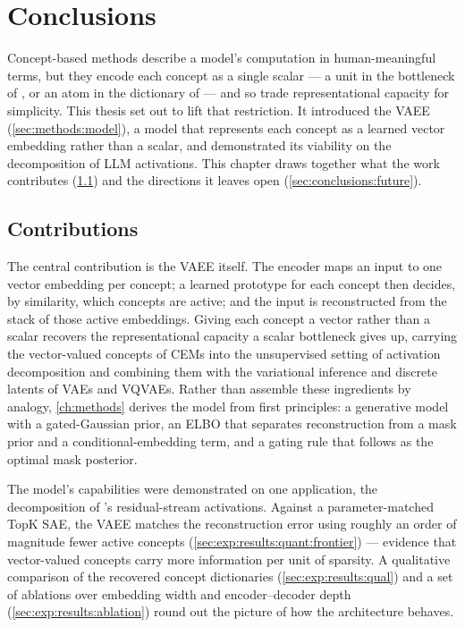 \chapter{Conclusions} \label{ch:conclusions}

Concept-based methods describe a model's computation in human-meaningful terms,
but they encode each concept as a single scalar --- a unit in the bottleneck of
, or an atom in the dictionary of  --- and so trade
representational capacity for simplicity. This thesis set out to lift that
restriction. It introduced the \ac{VAEE}
(\cref{sec:methods:model}), a model that
represents each concept as a learned vector embedding rather than a scalar, and
demonstrated its viability on the decomposition of \ac{LLM} activations. This
chapter draws together what the work contributes
(\cref{sec:conclusions:contrib}) and the
directions it leaves open
(\cref{sec:conclusions:future}).

\section{Contributions} \label{sec:conclusions:contrib}

The central contribution is the \ac{VAEE} itself. The encoder maps an input to
one vector embedding per concept; a learned prototype for each concept then
decides, by similarity, which concepts are active; and the input is
reconstructed from the stack of those active embeddings. Giving each concept a
vector rather than a scalar recovers the representational capacity a scalar
bottleneck gives up, carrying the vector-valued concepts of \acp{CEM} into the
unsupervised setting of activation decomposition and combining them with the
variational inference and discrete latents of \acp{VAE} and \acp{VQVAE}. Rather
than assemble these ingredients by analogy, \cref{ch:methods}
derives the model from first principles: a generative model with a
gated-Gaussian prior, an \ac{ELBO} that separates reconstruction from a mask
prior and a conditional-embedding term, and a gating rule that follows as the
optimal mask posterior. %

The model's capabilities were demonstrated on one application, the decomposition
of 's residual-stream activations. Against a parameter-matched TopK
\ac{SAE}, the \ac{VAEE} matches the reconstruction error using roughly an order
of magnitude fewer active concepts
(\cref{sec:exp:results:quant:frontier})
--- evidence that vector-valued concepts carry more information per unit of
sparsity. A qualitative comparison of the recovered concept dictionaries
(\cref{sec:exp:results:qual}) and a set
of ablations over embedding width and encoder--decoder depth
(\cref{sec:exp:results:ablation}) round out
the picture of how the architecture behaves.

